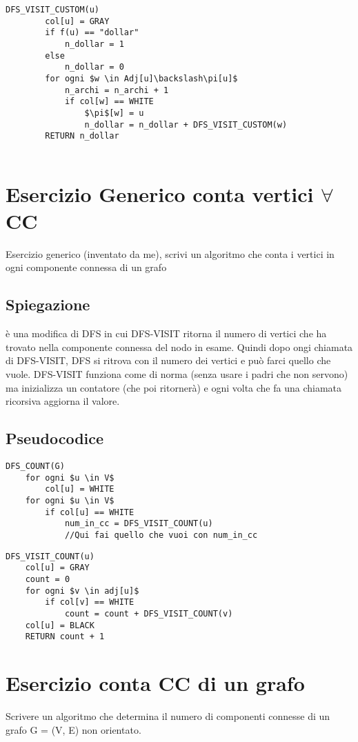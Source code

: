 \documentclass[12pt, a4paper, openany]{book}
\begin{document}
	\begin{lstlisting}[mathescape=true]
    DFS_VISIT_CUSTOM(u)
        col[u] = GRAY
        if f(u) == "dollar"
            n_dollar = 1
        else
            n_dollar = 0
        for ogni $w \in Adj[u]\backslash\pi[u]$
            n_archi = n_archi + 1
            if col[w] == WHITE
                $\pi$[w] = u
                n_dollar = n_dollar + DFS_VISIT_CUSTOM(w)
        RETURN n_dollar


    \end{lstlisting}

	\section{Esercizio Generico conta vertici $\forall$ CC}
	Esercizio generico (inventato da me), scrivi un algoritmo che conta i vertici in ogni componente connessa di un grafo

	\subsection*{Spiegazione}
	è una modifica di DFS in cui DFS-VISIT ritorna il numero di vertici che ha trovato nella componente connessa
	del nodo in esame. Quindi dopo ongi chiamata di DFS-VISIT, DFS si ritrova con il numero dei vertici e può farci quello che vuole.
	DFS-VISIT funziona come di norma (senza usare i padri che non servono) ma inizializza un contatore (che poi ritornerà) e ogni volta
	che fa una chiamata ricorsiva aggiorna il valore.

	\subsection*{Pseudocodice}

	\begin{lstlisting}[mathescape=true]
DFS_COUNT(G)
    for ogni $u \in V$
        col[u] = WHITE
    for ogni $u \in V$
        if col[u] == WHITE
            num_in_cc = DFS_VISIT_COUNT(u)
            //Qui fai quello che vuoi con num_in_cc 
\end{lstlisting}

	\begin{lstlisting}[mathescape=true]
DFS_VISIT_COUNT(u)
    col[u] = GRAY
    count = 0
    for ogni $v \in adj[u]$
        if col[v] == WHITE
            count = count + DFS_VISIT_COUNT(v)
    col[u] = BLACK
    RETURN count + 1
\end{lstlisting}

	\section{Esercizio conta CC di un grafo}
	Scrivere un algoritmo che determina il numero di componenti connesse di un grafo G =
	(V, E) non orientato.
\end{document}
